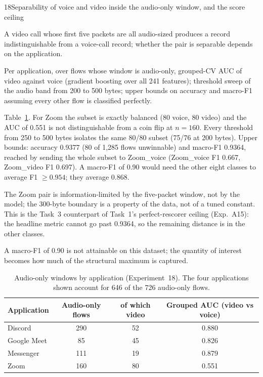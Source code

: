 \begin{explog}{18}{Separability of voice and video inside the audio-only window, and the score ceiling}
\item[Hypothesis] A video call whose first five packets are all audio-sized produces a record
indistinguishable from a voice-call record; whether the pair is separable depends on
the application.
\item[Method] Per application, over flows whose window is audio-only, grouped-CV AUC of
video against voice (gradient boosting over all 241 features); threshold sweep of
the audio band from 200 to 500 bytes; upper bounds on accuracy and macro-F1 assuming
every other flow is classified perfectly.
\item[Result] Table~\ref{tab:t3-ambig}. For Zoom the subset is exactly balanced (80 voice,
80 video) and the AUC of 0.551 is not distinguishable from a coin flip at $n=160$.
Every threshold from 250 to 500 bytes isolates the same 80/80 subset (75/76 at 200
bytes). Upper bounds: accuracy 0.9377 (80 of 1{,}285 flows unwinnable) and macro-F1
0.9364, reached by sending the whole subset to Zoom\_voice (Zoom\_voice F1 0.667,
Zoom\_video F1 0.697). A macro-F1 of 0.90 would need the other eight classes to
average F1 $\geq0.954$; they average 0.868.
\item[Inference] The Zoom pair is information-limited by the five-packet window, not by the
model; the 300-byte boundary is a property of the data, not of a tuned constant. This
is the Task~3 counterpart of Task~1's perfect-rescorer ceiling (Exp.~A15): the headline metric cannot go past 0.9364, so the remaining
distance is in the other classes.
\item[Verdict] A macro-F1 of 0.90 is not attainable on this dataset; the quantity of
interest becomes how much of the structural maximum is captured.
\end{explog}

\begin{table}[t]
\caption{Audio-only windows by application (Experiment~18). The four applications
shown account for 646 of the 726 audio-only flows.}
\label{tab:t3-ambig}
\centering
\begin{tabular}{lccc}
\hline
Application & Audio-only flows & of which video & Grouped AUC (video vs voice) \\
\hline
Discord & 290 & 52 & 0.880 \\
Google Meet & 85 & 45 & 0.826 \\
Messenger & 111 & 19 & 0.879 \\
Zoom & 160 & 80 & 0.551 \\
\hline
\end{tabular}
\end{table}
 

